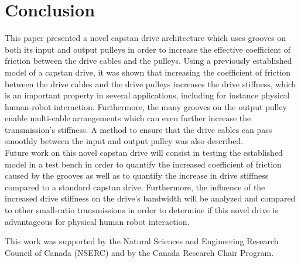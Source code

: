 \documentclass[10pt,cleanfoot]{asme2ej}
\begin{document}
\section{Conclusion}
This paper presented a novel capstan drive architecture which uses grooves on both its input and output pulleys in order to increase the effective coefficient of friction between the drive cables and the pulleys. Using a previously established model of a capstan drive, it was shown that increasing the coefficient of friction between the drive cables and the drive pulleys increases the drive stiffness, which is an important property in several applications, including for instance physical human-robot interaction. Furthermore, the many grooves on the output pulley enable multi-cable arrangements which can even further increase the transmission's stiffness. A method to ensure that the drive cables can pass smoothly between the input and output pulley was also described. \\
Future work on this novel capstan drive will consist in testing the established model in a test bench in order to quantify the increased coefficient of friction caused by the grooves as well as to quantify the increase in drive stiffness compared to a standard capstan drive. Furthermore, the influence of the increased drive stiffness on the drive's bandwidth will be analyzed and compared to other small-ratio transmissions in order to determine if this novel drive is advantageous for physical human robot interaction.
\begin{acknowledgment}
This work was supported by the Natural Sciences and Engineering Research Council of Canada (NSERC) and by the
Canada Research Chair Program.
\end{acknowledgment}

%



%

\end{document}
